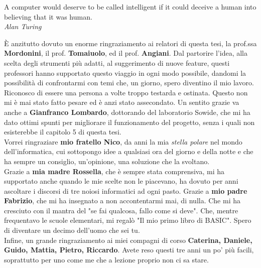 \documentclass[trieste,corpo=11pt,numerazioneromana]{toptesi}
\begin{document}

\begin{flushright}
  \noindent
  A computer would deserve to be called intelligent if it could deceive a human into believing that it was human.\\
  \small{\textit{Alan Turing}}
\end{flushright}
\cleardoublepage


\ringraziamenti
È anzitutto dovuto un enorme ringraziamento ai relatori di questa tesi, la prof.ssa \textbf{Mordonini}, il prof. \textbf{Tomaiuolo}, ed il prof. \textbf{Angiani}. Dal partorire l'idea, alla scelta degli strumenti più adatti, al suggerimento di nuove feature, questi professori hanno supportato questo viaggio in ogni modo possibile, dandomi la possibilità di confrontarmi con temi che, un giorno, spero diventino il mio lavoro. Riconosco di essere una persona a volte troppo testarda e ostinata. Questo non mi è mai stato fatto pesare ed è anzi stato assecondato. Un sentito grazie va anche a \textbf{Gianfranco Lombardo}, dottorando del laboratorio Sowide, che mi ha dato ottimi spunti per migliorare il funzionamento del progetto, senza i quali non esisterebbe il capitolo 5 di questa tesi. \\
Vorrei ringraziare \textbf{mio fratello Nico}, da anni la mia \textit{stella polare} nel mondo dell'informatica, cui sottopongo idee a qualsiasi ora del giorno e della notte e che ha sempre un consiglio, un'opinione, una soluzione che la svoltano.\\
Grazie a \textbf{mia madre Rossella}, che è sempre stata comprensiva, mi ha supportato anche quando le mie scelte non le piacevano, ha dovuto per anni ascoltare i discorsi di tre noiosi informatici ad ogni pasto.
Grazie a \textbf{mio padre Fabrizio}, che mi ha insegnato a non accontentarmi mai, di nulla. Che mi ha cresciuto con il mantra del "se fai qualcosa, fallo come si deve". Che, mentre frequentavo le scuole elementari, mi regalò "Il mio primo libro di BASIC". Spero di diventare un decimo dell'uomo che sei tu.\\
Infine, un grande ringraziamento ai miei compagni di corso \textbf{Caterina, Daniele, Guido, Mattia, Pietro, Riccardo}. Avete reso questi tre anni un po' più facili, soprattutto per uno come me che a lezione proprio non ci sa stare.
\end{document}
